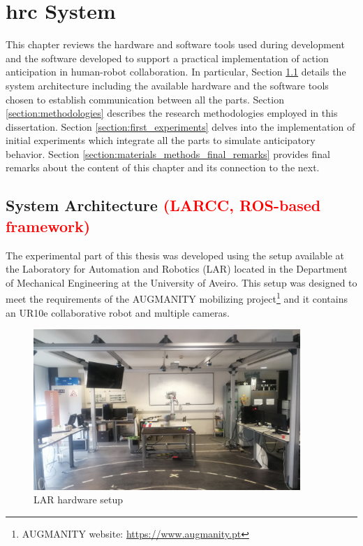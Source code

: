 \chapter{\acl{hrc} System}
\label{chapter:hrc_system}

This chapter reviews the hardware and software tools used during development and the software developed to support a practical implementation of action anticipation in human-robot collaboration. In particular, Section \ref{section:system_architecture} details the system architecture including the available hardware and the software tools chosen to establish communication between all the parts. Section \ref{section:methodologies} describes the research methodologies employed in this dissertation. Section \ref{section:first_experiments} delves into the implementation of initial experiments which integrate all the parts to simulate anticipatory behavior. Section \ref{section:materials_methods_final_remarks} provides final remarks about the content of this chapter and its connection to the next.

\section{System Architecture \textcolor{red}{(LARCC, ROS-based framework)}}
\label{section:system_architecture}

The experimental part of this thesis was developed using the setup available at the Laboratory for Automation and Robotics (LAR) located in the Department of Mechanical Engineering at the University of Aveiro. This setup was designed to meet the requirements of the AUGMANITY mobilizing project\footnote{AUGMANITY website: \url{https://www.augmanity.pt}} and it contains an UR10e collaborative robot and multiple cameras.

\begin{figure}[!ht]
\centerline{\includegraphics[width=0.9\textwidth, trim={0 5cm 0 0}, clip]{figs/setup2.jpg}}
\caption[setup]{LAR hardware setup}
\label{fig:LARCC}
\end{figure}

